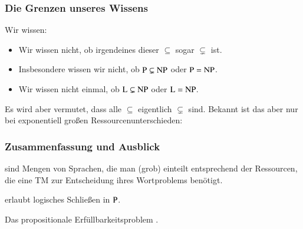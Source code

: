 \documentclass[aspectratio=1610,onlymath]{beamer}
\begin{document}
\begin{frame}\frametitle{Die Grenzen unseres Wissens}

Wir wissen:

\theobox{
\[\Scomplclass{L}\subseteq\Scomplclass{NL}\subseteq \Scomplclass{P}\subseteq\Scomplclass{NP}\subseteq\Scomplclass{PSpace}= \Scomplclass{NPSpace}\subseteq \Scomplclass{Exp}\subseteq \Scomplclass{NExp}\]
\vspace{-2.5ex}
}

\begin{itemize}
\item Wir wissen nicht, ob irgendeines dieser $\subseteq$ sogar $\subsetneq$ ist.
\item Insbesondere wissen wir nicht, ob ${\textsc{P}}\subsetneq{\textsc{NP}}$ oder ${\textsc{P}}={\textsc{NP}}$.
\item Wir wissen nicht einmal, ob ${\textsc{L}}\subsetneq{\textsc{NP}}$ oder ${\textsc{L}}={\textsc{NP}}$.
\end{itemize}\pause
Es wird aber vermutet, dass alle  $\subseteq$ eigentlich $\subsetneq$ sind.
% 
Bekannt ist das aber nur bei exponentiell großen Ressourcenunterschieden:


\end{frame}


\begin{frame}\frametitle{Zusammenfassung und Ausblick}

 sind Mengen von Sprachen, die man (grob) einteilt entsprechend der Ressourcen,
die eine TM zur Entscheidung ihres Wortproblems benötigt.
\bigskip


 erlaubt logisches Schließen in ${\textsc{P}}$.
\bigskip

Das propositionale Erfüllbarkeitsproblem .
\bigskip


\end{frame}
\end{document}
